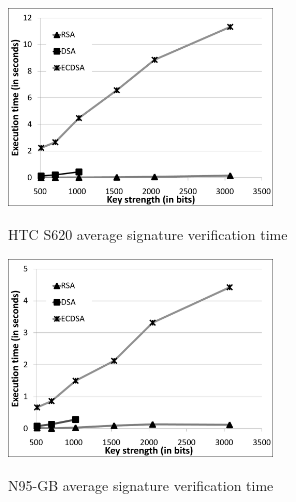 \documentclass[authoryear]{elsarticle}
\begin{document}
\begin{figure}[ht]
\begin{center}
  \includegraphics[width=7cm]{immagini/HTCVerify.pdf}\\
  \caption{HTC S620 average signature verification time}
  \label{fig:HTCVerify}
\end{center}
\end{figure}

\begin{figure}[ht]
\begin{center}
  \includegraphics[width=7cm]{immagini/N95Verify.pdf}\\
  \caption{N95-GB average signature verification time}
  \label{fig:N95Verify}
\end{center}
\end{figure}
\end{document}
